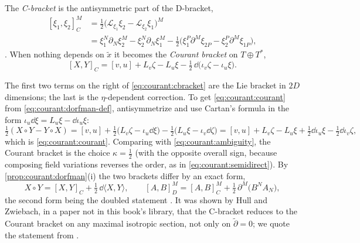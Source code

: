 \begin{definition}\label{def:courant:courant}
%
The \emph{C-bracket} is the antisymmetric part of the D-bracket,
\begin{equation}\label{eq:courant:cbracket}
\begin{aligned}
{}[\xi_1,\xi_2]_C^M&=\tfrac12\bigl(\mathcal L_{\xi_1}\xi_2-\mathcal L_{\xi_2}\xi_1\bigr)^M\\
&=\xi_1^N\partial_N\xi_2^M-\xi_2^N\partial_N\xi_1^M
-\tfrac12\bigl(\xi_1^P\partial^M\xi_{2P}-\xi_2^P\partial^M\xi_{1P}\bigr),
\end{aligned}
\end{equation}
. When nothing
depends on $\tilde x$ it becomes the \emph{Courant bracket} on $T\oplus T^*$,
\begin{equation}\label{eq:courant:courant}
[X,Y]_C=[v,u]+L_v\zeta-L_u\xi-\tfrac12\,\dd\bigl(\iota_v\zeta-\iota_u\xi\bigr).
\end{equation}
\end{definition}
The first two terms on the right of \eqref{eq:courant:cbracket} are the Lie bracket in $2D$
dimensions; the last is the $\eta$-dependent correction. To get \eqref{eq:courant:courant} from
\eqref{eq:courant:dorfman-def}, antisymmetrize and use Cartan's formula in the form
$\iota_u\dd\xi=L_u\xi-\dd\iota_u\xi$:
\[
\tfrac12(X\circ Y-Y\circ X)=[v,u]+\tfrac12\bigl(L_v\zeta-\iota_u\dd\xi\bigr)
-\tfrac12\bigl(L_u\xi-\iota_v\dd\zeta\bigr)
=[v,u]+L_v\zeta-L_u\xi+\tfrac12\dd\iota_u\xi-\tfrac12\dd\iota_v\zeta ,
\]
which is \eqref{eq:courant:courant}. Comparing with
\eqref{eq:courant:ambiguity}, the Courant bracket is the choice $\kappa=\tfrac12$ (with the
opposite overall sign, because composing field variations reverses the order, as in
\eqref{eq:courant:semidirect}). By \cref{prop:courant:dorfman}(i) the two brackets differ by an
exact form,
\begin{equation}\label{eq:courant:DminusC}
X\circ Y=[X,Y]_C+\tfrac12\,\dd\langle X,Y\rangle,\qquad
[A,B]_D^M=[A,B]_C^M+\tfrac12\,\partial^M\bigl(B^NA_N\bigr),
\end{equation}
the second form being the doubled statement . It was
shown by Hull and Zwiebach, in a paper not in this book's library, that the C-bracket reduces to
the Courant bracket on any maximal isotropic section, not only on $\tilde\partial=0$; we quote the
statement from  \TL.

